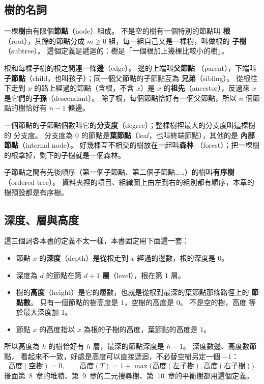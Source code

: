 \subsection{樹的名詞}

一棵\textbf{樹}由有限個\textbf{節點}（node）組成。 不是空的樹有一個特別的節點叫
\textbf{根}（root），其餘的節點分成 $m \ge 0$ 組，每一組自己又是一棵樹，叫做根的
\textbf{子樹}（subtree）。 這個定義是遞迴的：樹是「一個根加上幾棵比較小的樹」。

根和每棵子樹的根之間連一條\textbf{邊}（edge）。 邊的上端叫\textbf{父節點}
（parent），下端叫\textbf{子節點}（child，也叫孩子）；同一個父節點的子節點互為
\textbf{兄弟}（sibling）。 從根往下走到 $x$ 的路上經過的節點（含根，不含 $x$）是
$x$ 的\textbf{祖先}（ancestor），反過來 $x$ 是它們的\textbf{子孫}（descendant）。
除了根，每個節點恰好有一個父節點，所以 $n$ 個節點的樹恰好有 $n - 1$ 條邊。

一個節點的子節點個數叫它的\textbf{分支度}（degree）；整棵樹裡最大的分支度叫這棵樹的
分支度。 分支度為 $0$ 的節點是\textbf{葉節點}（leaf，也叫終端節點），其他的是
\textbf{內部節點}（internal node）。 好幾棵互不相交的樹放在一起叫\textbf{森林}
（forest）；把一棵樹的根拿掉，剩下的子樹就是一個森林。

子節點之間有先後順序（第一個子節點、第二個子節點……）的樹叫\textbf{有序樹}（ordered
tree）。 資料夾裡的項目、組織圖上由左到右的組別都有順序，本章的樹預設都是有序樹。

\subsection{深度、層與高度}

這三個詞各本書的定義不太一樣，本書固定用下面這一套：

\begin{itemize}
\item 節點 $x$ 的\textbf{深度}（depth）是從根走到 $x$ 經過的邊數，根的深度是 $0$。
\item 深度為 $d$ 的節點在第 $d + 1$ \textbf{層}（level），根在第 $1$ 層。
\item 樹的\textbf{高度}（height）是它的層數，也就是從根到最深的葉節點那條路徑上的
\textbf{節點數}。 只有一個節點的樹高度是 $1$，空樹的高度是 $0$。 不是空的樹，高度
等於最大深度加 $1$。
\item 節點 $x$ 的高度指以 $x$ 為根的子樹的高度，葉節點的高度是 $1$。
\end{itemize}

所以高度為 $h$ 的樹恰好有 $h$ 層，最深的節點深度是 $h - 1$。 深度數邊、高度數節點，
看起來不一致，好處是高度可以直接遞迴，不必替空樹另定一個 $-1$：
\[
\text{高度}(\text{空樹}) = 0, \qquad
\text{高度}(T) = 1 + \max\bigl(\text{高度}(\text{左子樹}), \text{高度}(\text{右子樹})\bigr).
\]
後面第~8~章的堆積、第~9~章的二元搜尋樹、第~10~章的平衡樹都用這個定義。

